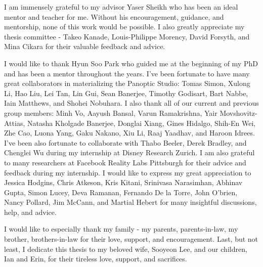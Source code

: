 \begin{acknowledgements}
I am immensely grateful to my advisor Yaser Sheikh who has been an ideal mentor and teacher for me. Without his encouragement, guidance, and mentorship, none of this work would be possible. I also greatly appreciate my thesis committee - Takeo Kanade,  Louis-Philippe Morency, David Forsyth, and Mina Cikara for their valuable feedback and advice.

I would like to thank Hyun Soo Park who guided me at the beginning of my PhD and has been a mentor throughout the years. I've been fortunate to have many great collaborators in materializing the Panoptic Studio: Tomas Simon, Xulong Li, Hao Liu, Lei Tan, Lin Gui, Sean Banerjee, Timothy Godisart, Bart Nabbe, Iain Matthews, and Shohei Nobuhara. I also thank all of our current and previous group members: Minh Vo, Aayush Bansal, Varun Ramakrishna, Yair Movshovitz-Attias, Natasha Kholgade Banerjee, Donglai Xiang, Gines Hidalgo, Shih-En Wei, Zhe Cao, Luona Yang, Gaku Nakano, Xiu Li, Raaj Yaadhav, and Haroon Idrees. I've been also fortunate to collaborate with Thabo Beeler, Derek Bradley, and Chenglei Wu during my internship at Disney Research Zurich. I am also grateful to many researchers at Facebook Reality Labs Pittsburgh for their advice and feedback during my internship. I would like to express my great appreciation to Jessica Hodgins, Chris Atkeson, Kris Kitani, Srinivasa Narasimhan, Abhinav Gupta, Simon Lucey, Deva Ramanan, Fernando De la Torre, John O’brien, Nancy Pollard, Jim McCann, and Martial Hebert for many insightful discussions, help, and advice.

I would like to especially thank my family - my parents, parents-in-law, my brother, brothers-in-law for their love, support, and encouragement. Last, but not least, I dedicate this thesis to my beloved wife, Sooyeon Lee, and our children, Ian and Erin, for their tireless love, support, and sacrifices. 
\end{acknowledgements}